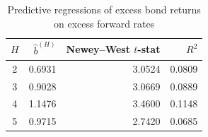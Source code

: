 \begin{table}[htbp]
  \centering
  \caption{Predictive regressions of excess bond returns on excess forward rates}
  \label{tab:q4c}
  \begin{tabular}{crrr}
    \toprule
    $H$ & $\hat{b}^{(H)}$ & Newey--West $t$-stat & $R^2$ \\
    \midrule
    2 & 0.6931 & 3.0524 & 0.0809 \\
    3 & 0.9028 & 3.0669 & 0.0889 \\
    4 & 1.1476 & 3.4600 & 0.1148 \\
    5 & 0.9715 & 2.7420 & 0.0685 \\
    \bottomrule
  \end{tabular}
\end{table}
